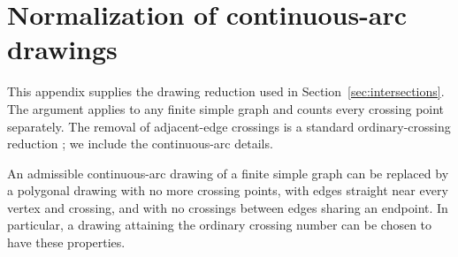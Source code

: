 \section{Normalization of continuous-arc drawings}
\label{sec:normalization}

This appendix supplies the drawing reduction used in
Section~\ref{sec:intersections}.  The argument applies to any finite
simple graph and counts every crossing point separately. The removal
of adjacent-edge crossings is a standard ordinary-crossing reduction
\cite{FulekEtAl2012}; we include the continuous-arc details.

\begin{lemma}
\label{lem:normalization}
An admissible continuous-arc drawing of a finite simple graph can be
replaced by a polygonal drawing with no more crossing points, with
edges straight near every vertex and crossing, and with no crossings
between edges sharing an endpoint.  In particular, a drawing attaining
the ordinary crossing number can be chosen to have these properties.
\end{lemma}

